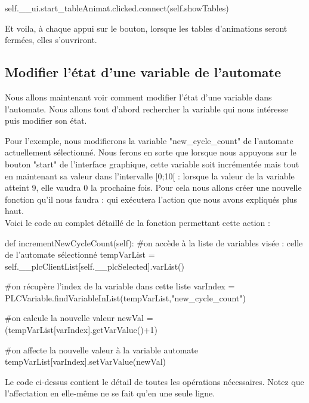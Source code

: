 {\begin{enumerate}
    \begin{Python}
        self.__ui.start_tableAnimat.clicked.connect(self.showTables)
    \end{Python}
   
\end{enumerate}

Et voila, à chaque appui sur le bouton, lorsque les tables d'animations seront fermées, elles s'ouvriront.

\subsection{Modifier l'état d'une variable de l'automate}

Nous allons maintenant voir comment modifier l'état d'une variable dans l'automate.\newline
Nous allons tout d'abord rechercher la variable qui nous intéresse puis modifier son état.

Pour l'exemple, nous modifierons la variable "new\_cycle\_count" de l'automate actuellement sélectionné.\newline
Nous ferons en sorte que lorsque nous appuyons sur le bouton "start" de l'interface graphique, cette variable soit incrémentée mais tout en maintenant sa valeur dans l'intervalle [0;10[ : lorsque la valeur de la variable atteint 9, elle vaudra 0 la prochaine fois.\newline
Pour cela nous allons créer une nouvelle fonction qu'il nous faudra  :  qui exécutera l'action que nous avons expliqués plus haut.\\
Voici le code au complet détaillé de la fonction permettant cette action :

\begin{Python}
def incrementNewCycleCount(self):
	#on accède à la liste de variables visée : celle de l'automate sélectionné
	tempVarList = self.__plcClientList[self.__plcSelected].varList()

	#on récupère l'index de la variable dans cette liste
	varIndex = PLCVariable.findVariableInList(tempVarList,"new_cycle_count")

	#on calcule la nouvelle valeur
	newVal = (tempVarList[varIndex].getVarValue()+1)%

	#on affecte la nouvelle valeur à la variable automate
	tempVarList[varIndex].setVarValue(newVal)
\end{Python}
Le code ci-dessus contient le détail de toutes les opérations nécessaires.\newline
Notez que l'affectation en elle-même ne se fait qu'en une seule ligne.\\

}
